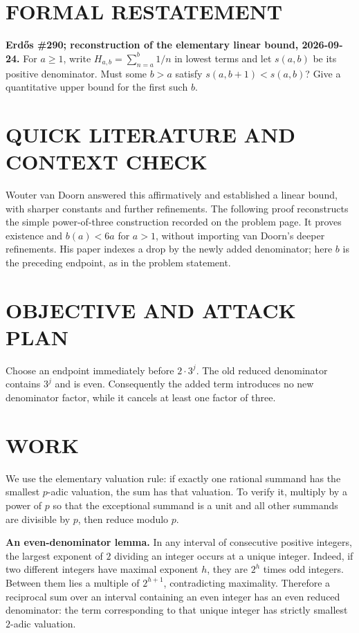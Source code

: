 \section{FORMAL RESTATEMENT}
\textbf{Erd\H{o}s \#290; reconstruction of the elementary linear bound, 2026-09-24.}
For $a\geq1$, write $H_{a,b}=\sum_{n=a}^b1/n$ in lowest terms and let $s(a,b)$ be its positive denominator. Must some $b>a$ satisfy $s(a,b+1)<s(a,b)$? Give a quantitative upper bound for the first such $b$.

\section{QUICK LITERATURE AND CONTEXT CHECK}
Wouter van Doorn answered this affirmatively and established a linear bound, with sharper constants and further refinements. The following proof reconstructs the simple power-of-three construction recorded on the problem page. It proves existence and $b(a)<6a$ for $a>1$, without importing van Doorn's deeper refinements. His paper indexes a drop by the newly added denominator; here $b$ is the preceding endpoint, as in the problem statement.

\section{OBJECTIVE AND ATTACK PLAN}
Choose an endpoint immediately before $2\cdot3^j$. The old reduced denominator contains $3^j$ and is even. Consequently the added term introduces no new denominator factor, while it cancels at least one factor of three.

\section{WORK}
We use the elementary valuation rule: if exactly one rational summand has the smallest $p$-adic valuation, the sum has that valuation. To verify it, multiply by a power of $p$ so that the exceptional summand is a unit and all other summands are divisible by $p$, then reduce modulo $p$.

\textbf{An even-denominator lemma.} In any interval of consecutive positive integers, the largest exponent of $2$ dividing an integer occurs at a unique integer. Indeed, if two different integers have maximal exponent $h$, they are $2^h$ times odd integers. Between them lies a multiple of $2^{h+1}$, contradicting maximality. Therefore a reciprocal sum over an interval containing an even integer has an even reduced denominator: the term corresponding to that unique integer has strictly smallest $2$-adic valuation.

